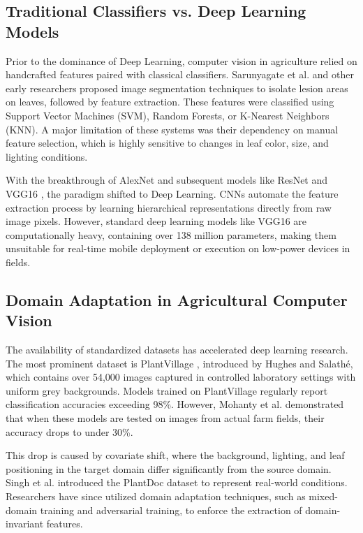\documentclass[12pt, a4paper]{report}
\begin{document}
\subsection{Traditional Classifiers vs. Deep Learning Models}
Prior to the dominance of Deep Learning, computer vision in agriculture relied on handcrafted features paired with classical classifiers. Sarunyagate et al. \cite{sarunyagate1996} and other early researchers proposed image segmentation techniques to isolate lesion areas on leaves, followed by feature extraction. These features were classified using Support Vector Machines (SVM), Random Forests, or K-Nearest Neighbors (KNN). A major limitation of these systems was their dependency on manual feature selection, which is highly sensitive to changes in leaf color, size, and lighting conditions.

With the breakthrough of AlexNet and subsequent models like ResNet and VGG16 \cite{vgg}, the paradigm shifted to Deep Learning. CNNs automate the feature extraction process by learning hierarchical representations directly from raw image pixels. However, standard deep learning models like VGG16 are computationally heavy, containing over 138 million parameters, making them unsuitable for real-time mobile deployment or execution on low-power devices in fields.

\subsection{Domain Adaptation in Agricultural Computer Vision}
The availability of standardized datasets has accelerated deep learning research. The most prominent dataset is PlantVillage \cite{plantvillage}, introduced by Hughes and Salathé, which contains over 54,000 images captured in controlled laboratory settings with uniform grey backgrounds. Models trained on PlantVillage regularly report classification accuracies exceeding 98\%. However, Mohanty et al. \cite{mohanty} demonstrated that when these models are tested on images from actual farm fields, their accuracy drops to under 30\%.

This drop is caused by covariate shift, where the background, lighting, and leaf positioning in the target domain differ significantly from the source domain. Singh et al. \cite{plantdoc} introduced the PlantDoc dataset to represent real-world conditions. Researchers have since utilized domain adaptation techniques, such as mixed-domain training and adversarial training, to enforce the extraction of domain-invariant features.
\end{document}
